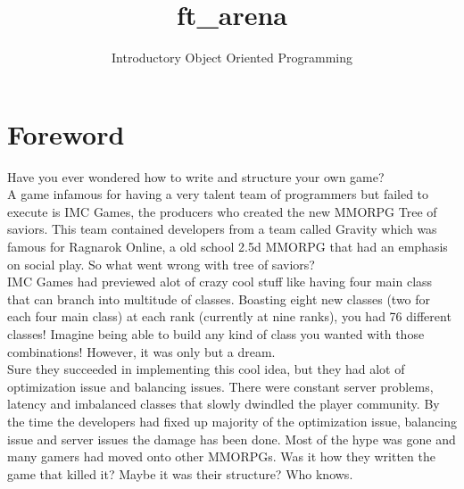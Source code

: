 \documentclass{42-en}
\begin{document}
                           \title{ft\_arena}
                          \subtitle{Introductory Object Oriented Programming}

\maketitle

\tableofcontents


\chapter{Foreword}

	Have you ever wondered how to write and structure your own game?\\

	A game infamous for having a very talent team of programmers but
	failed to execute is IMC Games, the producers who created the new
	MMORPG Tree of saviors. This team contained developers from a team
	called Gravity which was famous for Ragnarok Online, a old school
	2.5d MMORPG that had an emphasis on social play. So what went wrong
	with tree of saviors?\\

	IMC Games had previewed alot of crazy cool stuff like having four main
	class that can branch into multitude of classes. Boasting eight new classes
	(two for each four main class) at each rank (currently at nine ranks), 
	you had 76 different classes! Imagine being able to build any kind of class
	you wanted with those combinations! However, it was only but a dream.\\

	Sure they succeeded in implementing this cool idea, but they had alot of
	optimization issue and balancing issues. There were constant server problems,
	latency and imbalanced classes that slowly dwindled the player community.
	By the time the developers had fixed up majority of the optimization issue,
	balancing issue and server issues the damage has been done. Most of the hype
	was gone and many gamers had moved onto other MMORPGs. Was it how they written
	the game that killed it? Maybe it was their structure? Who knows.\\
\end{document}
